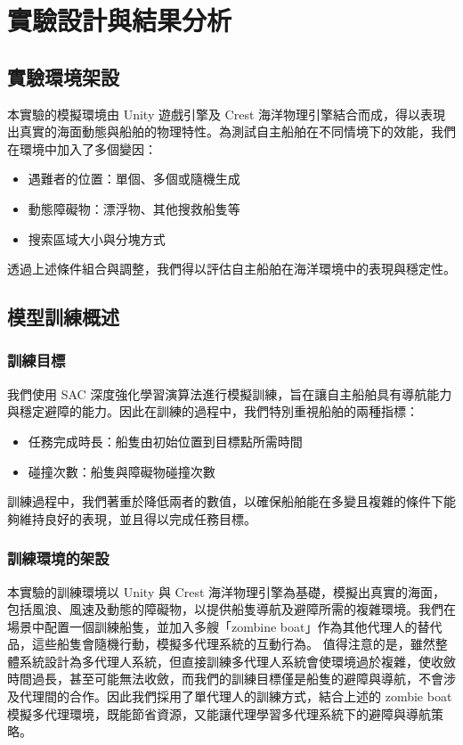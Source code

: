 \documentclass[12pt,a4paper]{article}
\begin{document}
\section{實驗設計與結果分析}

\subsection{實驗環境架設}
本實驗的模擬環境由 Unity 遊戲引擎及 Crest 海洋物理引擎結合而成，得以表現出真實的海面動態與船舶的物理特性。為測試自主船舶在不同情境下的效能，我們在環境中加入了多個變因：
\begin{itemize}
    \item 遇難者的位置：單個、多個或隨機生成
    \item 動態障礙物：漂浮物、其他搜救船隻等
    \item 搜索區域大小與分塊方式
\end{itemize}
透過上述條件組合與調整，我們得以評估自主船舶在海洋環境中的表現與穩定性。

\subsection{模型訓練概述}
\subsubsection{訓練目標}
我們使用 SAC 深度強化學習演算法進行模擬訓練，旨在讓自主船舶具有導航能力與穩定避障的能力。因此在訓練的過程中，我們特別重視船舶的兩種指標：
\begin{itemize}
    \item 任務完成時長：船隻由初始位置到目標點所需時間
    \item 碰撞次數：船隻與障礙物碰撞次數
\end{itemize}
訓練過程中，我們著重於降低兩者的數值，以確保船舶能在多變且複雜的條件下能夠維持良好的表現，並且得以完成任務目標。

\subsubsection{訓練環境的架設}
本實驗的訓練環境以 Unity 與 Crest 海洋物理引擎為基礎，模擬出真實的海面，包括風浪、風速及動態的障礙物，以提供船隻導航及避障所需的複雜環境。我們在場景中配置一個訓練船隻，並加入多艘「zombine boat」作為其他代理人的替代品，這些船隻會隨機行動，模擬多代理系統的互動行為。
值得注意的是，雖然整體系統設計為多代理人系統，但直接訓練多代理人系統會使環境過於複雜，使收斂時間過長，甚至可能無法收斂，而我們的訓練目標僅是船隻的避障與導航，不會涉及代理間的合作。因此我們採用了單代理人的訓練方式，結合上述的 zombie boat 模擬多代理環境，既能節省資源，又能讓代理學習多代理系統下的避障與導航策略。
\end{document}
